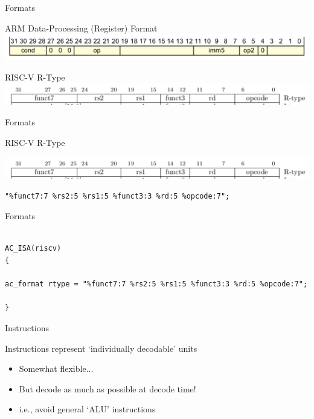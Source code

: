 \begin{frame}{Formats}

\centering
ARM Data-Processing (Register) Format
\includegraphics[width=\textwidth]{figures/format-arm}

\bigskip

RISC-V R-Type
\includegraphics[width=\textwidth]{figures/format-riscv}

\end{frame}

\begin{frame}[fragile]{Formats}

\bigskip

RISC-V R-Type

\includegraphics[width=\textwidth]{figures/format-riscv}

\begin{lstlisting}
"%funct7:7 %rs2:5 %rs1:5 %funct3:3 %rd:5 %opcode:7";
\end{lstlisting}

\end{frame}

\begin{frame}[fragile]{Formats}

\begin{lstlisting}

AC_ISA(riscv)
{

ac_format rtype = "%funct7:7 %rs2:5 %rs1:5 %funct3:3 %rd:5 %opcode:7";

}

\end{lstlisting}

\end{frame}

\begin{frame}{Instructions}

Instructions represent `individually decodable' units
\begin{itemize}
\item Somewhat flexible...
\item<2-> But decode as much as possible at decode time!
\item<3-> i.e., avoid general `ALU' instructions
\end{itemize}

\end{frame}

